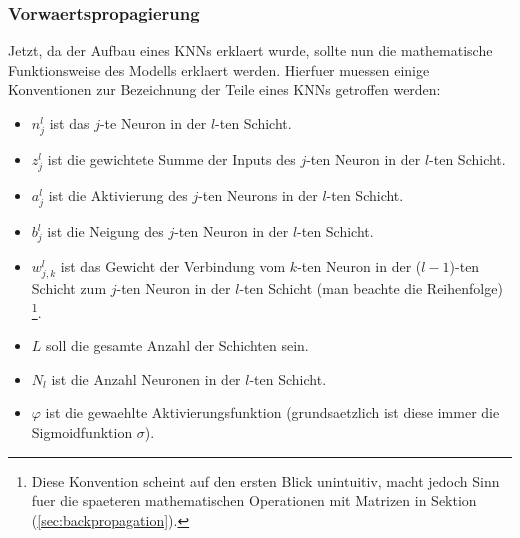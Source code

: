 \documentclass[../main]{subfiles}
\begin{document}
\subsubsection{Vorwaertspropagierung}
Jetzt, da der Aufbau eines KNNs erklaert wurde, sollte nun die mathematische Funktionsweise
des Modells erklaert werden. Hierfuer muessen einige Konventionen zur
Bezeichnung der Teile eines KNNs getroffen werden:

\begin{itemize}

\item{$n_j^l$ ist das $j$-te Neuron in der $l$-ten Schicht.}
\item{$z_j^l$ ist die gewichtete Summe der Inputs des $j$-ten Neuron in der $l$-ten Schicht.}
\item{$a_j^l$ ist die Aktivierung des $j$-ten Neurons in der $l$-ten Schicht.}
\item{$b_j^l$ ist die Neigung des $j$-ten Neuron in der $l$-ten Schicht.}
\item{$w_{j,k}^l$ ist das Gewicht der Verbindung vom $k$-ten Neuron
    in der ($l-1$)-ten Schicht zum $j$-ten Neuron in der $l$-ten Schicht (man
    beachte die Reihenfolge)
    \footnote{
      Diese Konvention scheint auf den ersten Blick unintuitiv, macht jedoch
      Sinn fuer die spaeteren mathematischen Operationen mit Matrizen in Sektion
      (\ref{sec:backpropagation}).
    }.}

\item{$L$ soll die gesamte Anzahl der Schichten sein.}

\item{$N_l$ ist die Anzahl Neuronen in der $l$-ten Schicht.}

\item{$\varphi$ ist die gewaehlte Aktivierungsfunktion (grundsaetzlich ist diese
    immer die Sigmoidfunktion $\sigma$).}

\end{itemize}
\end{document}
